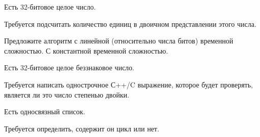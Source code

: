 \begin{problem}

Есть 32-битовое целое число.

Требуется подсчитать количество единиц в двоичном представлении этого числа.

Предложите алгоритм с линейной (относительно числа битов) временной сложностью. С константной временной сложностью.  

\end{problem}
\begin{problem}

Есть 32-битовое целое беззнаковое число.

Требуется написать однострочное С++/C выражение, которое будет проверять, является ли это число степенью двойки.

\end{problem}
\begin{problem}

Есть односвязный список.

Требуется определить, содержит он цикл или нет.

\end{problem}
